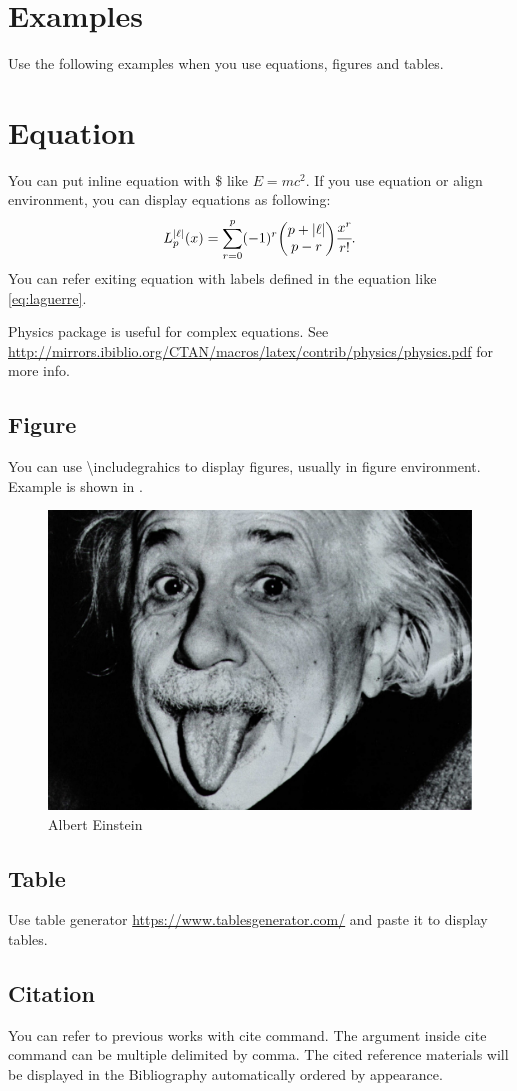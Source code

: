 \section{Examples}
Use the following examples when you use equations, figures and tables.

\section{Equation}
You can put inline equation with \$ like $E=mc^2$. If you use equation or align environment, you can display equations as following:
\begin{align}
    L_p^{|\ell|}(x) = \sum_{r=0}^{p}(-1)^r\mqty(p+|\ell|\\p-r)\cfrac{x^r}{r!}. \label{eq:laguerre}
\end{align}
You can refer exiting equation with labels defined in the equation like \eqref{eq:laguerre}.

Physics package is useful for complex equations. See \url{http://mirrors.ibiblio.org/CTAN/macros/latex/contrib/physics/physics.pdf} for more info.

\subsection{Figure}
You can use \textbackslash includegrahics to display figures, usually in figure environment. Example is shown in .
\begin{figure}[htbp] %
    \centering
    \includegraphics[width=0.9\linewidth]{Figures/Chapter2/einstein.jpeg}
    \caption{Albert Einstein}
    \label{fig:einstein}
\end{figure}

\subsection{Table}
Use table generator \url{https://www.tablesgenerator.com/} and paste it to display tables.

\subsection{Citation}
You can refer to previous works with cite command\cite{maiman1960stimulated}. The argument inside cite command can be multiple delimited by comma. The cited reference materials will be displayed in the Bibliography automatically ordered by appearance.